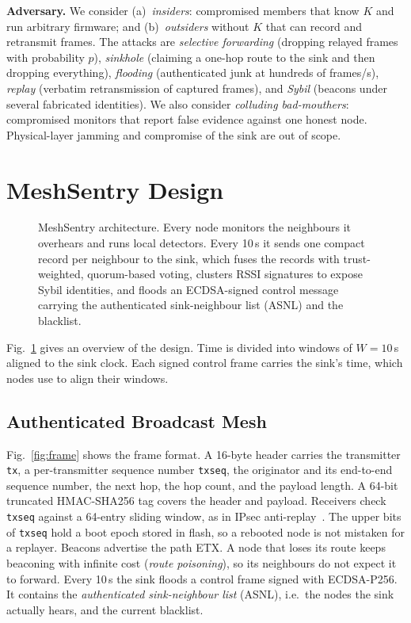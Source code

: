 \documentclass[conference]{IEEEtran}
\begin{document}
\textbf{Adversary.} We consider (a)~\emph{insiders}: compromised members
that know $K$ and run arbitrary firmware; and (b)~\emph{outsiders} without
$K$ that can record and retransmit frames. The attacks are
\emph{selective forwarding} (dropping relayed frames with probability $p$),
\emph{sinkhole} (claiming a one-hop route to the sink and then dropping
everything), \emph{flooding} (authenticated junk at hundreds of frames/s),
\emph{replay} (verbatim retransmission of captured frames), and
\emph{Sybil} (beacons under several fabricated identities). We also consider
\emph{colluding bad-mouthers}: compromised monitors that report false evidence
against one honest node. Physical-layer jamming and compromise of the sink are out of scope.

\section{MeshSentry Design}
\label{sec:design}
\begin{figure}[t]
\centering

\caption{MeshSentry architecture. Every node monitors the neighbours it
overhears and runs local detectors. Every 10\,s it sends one compact record per
neighbour to the sink, which fuses the records with trust-weighted, quorum-based voting, clusters
RSSI signatures to expose Sybil identities, and floods an ECDSA-signed control
message carrying the authenticated sink-neighbour list (ASNL) and the blacklist.}
\label{fig:arch}
\end{figure}

Fig.~\ref{fig:arch} gives an overview of the design. Time is divided into
windows of $W=10$\,s aligned to the sink clock. Each signed control frame
carries the sink's time, which nodes use to align their windows.

\subsection{Authenticated Broadcast Mesh}
Fig.~\ref{fig:frame} shows the frame format. A 16-byte header carries the
transmitter \texttt{tx}, a per-transmitter sequence number \texttt{txseq}, the
originator and its end-to-end sequence number, the next hop, the hop count, and
the payload length. A 64-bit truncated HMAC-SHA256 tag covers the header and
payload. Receivers check \texttt{txseq} against a 64-entry sliding window,
as in IPsec anti-replay~\cite{rfc4303}. The upper bits of \texttt{txseq} hold a
boot epoch stored in flash, so a rebooted node is not mistaken for a replayer.
Beacons advertise the path ETX. A node that loses its route keeps
beaconing with infinite cost (\emph{route poisoning}), so its neighbours
do not expect it to forward.
Every 10\,s the sink floods a control frame signed with ECDSA-P256. It
contains the \emph{authenticated sink-neighbour list} (ASNL), i.e.\ the nodes
the sink actually hears, and the current blacklist.
\end{document}
